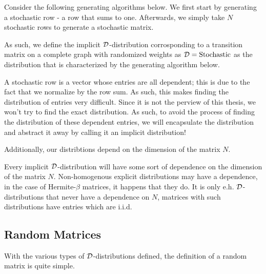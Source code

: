 Consider the following generating algorithms below. We first start by generating a stochastic row - a row that sums to one. Afterwards, we simply take $N$ stochastic rows to generate a stochastic matrix.

\ALGstochrow

As such, we define the implicit $\mathcal{D}$-distribution corrosponding to a transition matrix on a complete graph with randomized weights as $\mathcal{D} = \text{Stochastic}$ as the distribution that
is characterized by the generating algorithm below.

\ALGstoch

\begin{remark}
A stochastic row is a vector whose entries are all dependent; this is due to the fact that we normalize by the row sum.
As such, this makes finding the distribution of entries very difficult. Since it is not the perview of this thesis, we won't try to find the exact distribution.
As such, to avoid the process of finding the distribution of these dependent entries, we will encapsulate the distribution and abstract it away by calling it an implicit distribution!
\end{remark}

Additionally, our distribtions depend on the dimension of the matrix $N$.

\begin{remark}[Dependence on $N$]
Every implicit $\mathcal{D}$-distribution will have some sort of dependence on the dimension of the matrix $N$.
Non-homogenous explicit distributions may have a dependence, in the case of Hermite-$\beta$ matrices, it happens that they do.
It is only e.h. $\mathcal{D}$-distributions that never have a dependence on $N$, matrices with such distributions have entries which are i.i.d.
\end{remark}


\subsection{Random Matrices}

With the various types of $\mathcal{D}$-distributions defined, the definition of a random matrix is quite simple.

